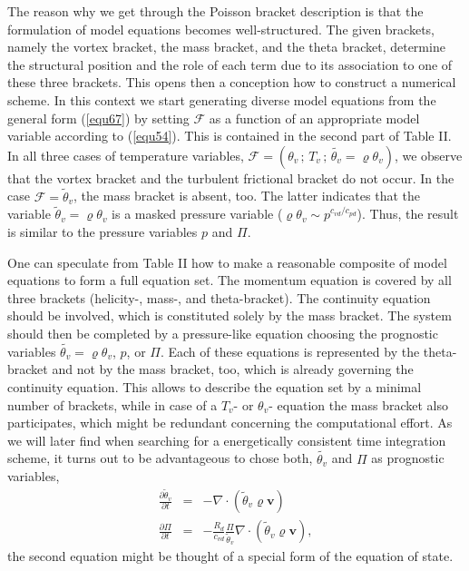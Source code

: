 The reason why we get through the Poisson bracket description is that the formulation of model equations becomes well-structured. The given brackets, namely the vortex bracket, the mass bracket, and the theta bracket, determine the structural position and the role of each term due to its association to one of these three brackets. This opens then a conception how to construct a numerical scheme. In this context we start generating diverse model equations from the general form (\ref{equ67}) by setting $\mathcal{F}$ as a function of an appropriate model variable according to (\ref{equ54}).
This is contained in the second part of Table II.
In all three cases of temperature variables, $ \mathcal{F}= (\theta_v \,; \,T_v\, ;\, \tilde{\theta_v} =\varrho \theta_v) $, we observe that the vortex bracket and the turbulent frictional bracket do not occur. In the case $\mathcal{F}= \tilde\theta_v$, the mass bracket is absent, too. The latter indicates that the variable $\tilde{\theta}_v=\varrho\theta_v$ is a masked pressure variable ($\varrho\theta_v \sim p^{c_{vd}/c_{pd}}$). Thus, the result is similar to the pressure  variables $p$ and $\Pi$.

One can speculate from Table II how to make a reasonable composite of model equations to form a full equation set. The momentum equation is covered by all three brackets (helicity-, mass-, and theta-bracket). The continuity equation should be involved, which is constituted solely by the mass bracket. The system should then be completed by a pressure-like equation choosing the prognostic variables $\tilde{\theta_v} =\varrho \theta_v $, $p$, or $\Pi$. Each of these equations is represented by the theta-bracket and not by the mass bracket, too, which is already governing the continuity equation. This allows to describe the equation set by a minimal number of brackets, while in case of a $T_v$- or $\theta_v$- equation the mass bracket also participates, which might be redundant concerning the computational effort. As we will later find when searching for a energetically consistent time integration
scheme, it turns out to be advantageous to chose both, $\tilde{\theta_v}$
and $\Pi$ as prognostic variables,
\begin{eqnarray*}
 \frac{\partial\tilde\theta_v}{\partial t}&=&-\nabla\cdot\left(\tilde\theta_v
\varrho\mathbf{v}\right)\\
\frac{\partial\Pi}{\partial t}&=&-\frac{R_d}{c_{vd}}\frac{\Pi}{\tilde\theta_v}
\nabla\cdot\left(\tilde\theta_v\varrho\mathbf{v}\right),
\end{eqnarray*}
the second equation might be thought
of a special form of the equation of state.

